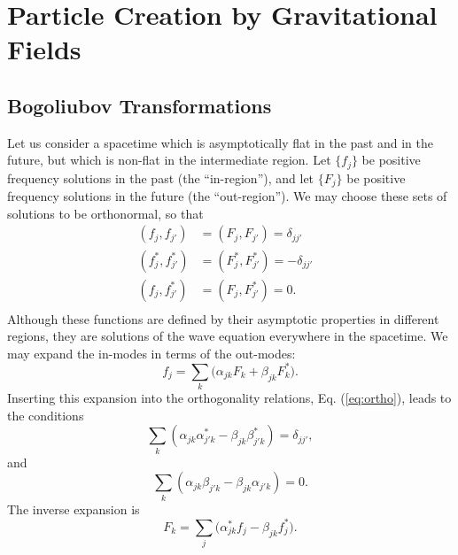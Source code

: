 \documentclass[12pt,onecolumn,eqsecnum,floats,aps,prd,floatfix,titlepage,tightenlines]{revtex4-2}
\begin{document}
\section{Particle Creation by Gravitational Fields}
\label{sec:particle-creation}


\subsection{Bogoliubov Transformations}
\label{sec:Bogoliubov}

    Let us consider a spacetime which is asymptotically flat in the past
and in the future, but which is non-flat in the intermediate region.
Let $\{ f_j \}$ be positive frequency solutions in the past (the 
``in-region''), and let $\{ F_j \}$ be positive frequency solutions in 
the future (the ``out-region'').  We may choose these sets of solutions
to be orthonormal, so that
\begin{equation}
\begin{aligned}
(f_j,f_{j'})&= (F_{j},F_{j'})=\delta _{jj'}& \\
(f_j^*,f_{j'}^*)& = (F_{j}^*,F_{j'}^*)= -\delta _{jj'}& \nonumber \\
(f_j,f_{j'}^*)& = (F_{j},F_{j'}^*)= 0. \\
\end{aligned}
\label{eq:ortho}
\end{equation}
Although these functions are defined by their asymptotic properties in
different regions, they are solutions of the wave equation everywhere
in the spacetime. We may expand the in-modes in terms of the out-modes:
\begin{equation}
f_j=\sum\limits_k {(\alpha _{jk}}F_k + \beta _{jk}F_k^*).
\label{eq:in-out}
\end{equation}
Inserting this expansion into the orthogonality relations, 
Eq. (\ref{eq:ortho}), leads to the conditions
\begin{equation}
\sum\limits_k {(\alpha _{jk}\alpha _{j'k}^*-\beta _{jk}\beta_{j'k}^*)
= \delta _{jj'}}, \label{eq:alphabeta}
\end{equation}
and
\begin{equation}
 \sum\limits_k (\alpha _{jk}\beta _{j'k}-\beta _{jk}\alpha _{j'k})=0.
\end{equation}
The inverse expansion is 
\begin{equation}
F_k=\sum\limits_j {(\alpha _{jk}^*}f_j - \beta _{jk}f_j^*).
\end{equation}
\end{document}
